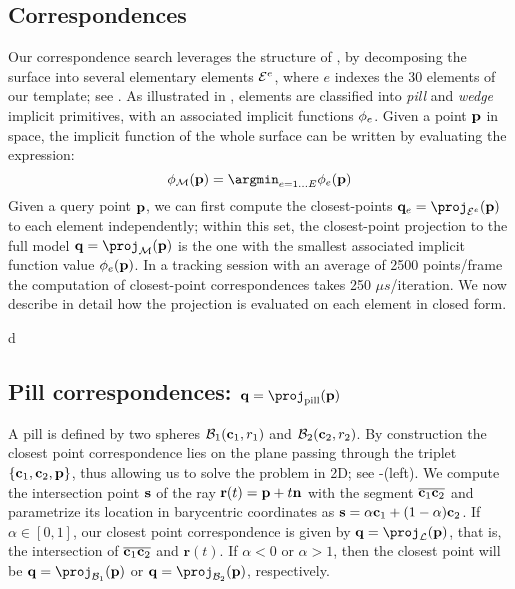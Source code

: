 \subsection{Correspondences}
\label{sec:corresp}
Our correspondence search leverages the structure of , by decomposing the surface into several elementary elements $\mathcal{E}^e$, where $e$ indexes the 30 elements of our template; see \VideoElements{}. As illustrated in , elements are classified into 
\emph{pill} and \emph{wedge} implicit primitives, with an associated implicit functions $\phi_e$.
Given a point $\mathbf{p}$ in space, the implicit function of the whole surface can be written by evaluating the expression:
\begin{equation}
\implicit_\surface(\pointHmodel) = \argmin_{e=1 \dots E} \implicit_e(\pointHmodel)
\label{eq:piecewise}
\end{equation}
%
Given a query point $\mathbf{p}$, we can first compute the closest-points $\footpoint_e = \proj_{\element}(\pointHmodel)$ to each element independently; within this set, the closest-point projection to the full model $\footpoint = \proj_\surface(\pointHmodel)$ is the one with the smallest associated implicit function value $\phi_e(\mathbf{p})$. In a tracking session with an average of 2500 points/frame the computation of closest-point correspondences takes 250 $\mu s$/iteration. 
%
We now describe in detail how the projection is evaluated on each element in closed form. 

d
\subsection*{Pill correspondences: $\footpoint=\proj_\text{pill}(\pointHmodel)$}
A pill is defined by two spheres $\mathcal{B}_1(\mathbf{c}_1,r_1)$ and $\mathcal{B}_2(\mathbf{c}_2,r_2)$. By construction the closest point correspondence lies on the plane passing through the triplet $\{ \mathbf{c}_1, \mathbf{c}_2, \mathbf{p} \}$, thus allowing us to solve the problem in 2D; see -(left). 
% 
We compute the intersection point $\mathbf{s}$ of the ray $\mathbf{r}(t) = \mathbf{p} + t\mathbf{n}$ with the segment $\overline{\mathbf{c}_1 \mathbf{c}_2}$ and parametrize its location in barycentric coordinates as $\mathbf{s} = \alpha\mathbf{c}_1 + (1-\alpha)\mathbf{c}_2$. If $\alpha \in [0,1]$, our closest point correspondence is given by $\footpoint=\proj_\mathcal{L}(\pointHmodel)$, that is, the intersection of $\overline{\mathbf{c}_1 \mathbf{c}_2}$ and $\mathbf{r}(t)$.  If $\alpha<0$ or $\alpha>1$, then the closest point will be $\footpoint=\proj_{\ball_1}(\pointHmodel)$ or $\footpoint=\proj_{\ball_2}(\pointHmodel)$, respectively. 

